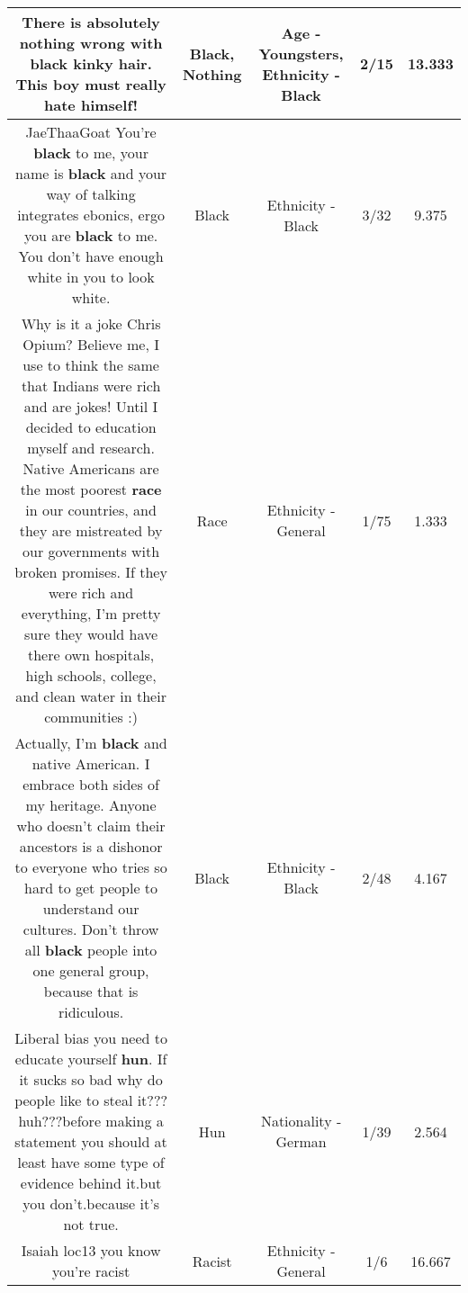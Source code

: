 \documentclass[11pt]{article}
\newlength\mylength
\begin{document}
\begin{center}
\begin{longtable}{|C{.65\mylength}|C{.30\mylength}|C{.12\mylength}|C{.12\mylength}|C{.12\mylength}|}
  \small There is absolutely \textbf{nothing} wrong with \textbf{black} kinky hair.   This boy must really hate himself!\normalsize   & Black, Nothing & Age - Youngsters, Ethnicity - Black & 2/15 & 13.333 \\  \hline
  \small JaeThaaGoat You're \textbf{black} to me, your name is \textbf{black} and your way of talking integrates ebonics, ergo you are \textbf{black} to me.  You don't have enough white in you to look white.\normalsize   & Black & Ethnicity - Black & 3/32 & 9.375 \\  \hline
  \small Why is it a joke Chris Opium? Believe me, I use to think the same that Indians were rich and are jokes! Until I decided to education myself and research. Native Americans are the most poorest \textbf{race} in our countries, and they are mistreated by our governments with broken promises. If they were rich and everything, I'm pretty sure they would have there own hospitals, high schools, college, and clean water in their communities :)\normalsize   & Race & Ethnicity - General & 1/75 & 1.333 \\  \hline
  \small Actually, I'm \textbf{black} and native American. I embrace both sides of my heritage. Anyone who doesn't claim their ancestors is a dishonor to everyone who tries so hard to get people to understand our cultures. Don't throw all \textbf{black} people into one general group, because that is ridiculous.\normalsize   & Black & Ethnicity - Black & 2/48 & 4.167 \\  \hline
  \small Liberal bias you need to educate yourself \textbf{hun}. If it sucks so bad why do people like to steal it???huh???before making a statement you should at least have some type of evidence behind it.but you don't.because it's not true.\normalsize   & Hun & Nationality - German & 1/39 & 2.564 \\  \hline
  \small Isaiah loc13 you know you're racist\normalsize   & Racist & Ethnicity - General & 1/6 & 16.667 \\  \hline

\end{longtable}
\end{center}
\end{document}
